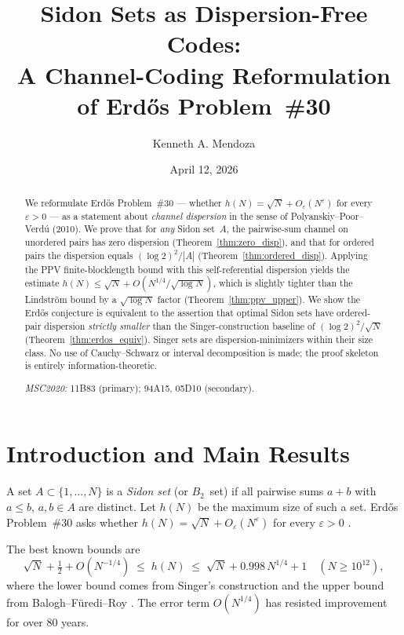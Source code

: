 \documentclass[11pt]{amsart}
\title{Sidon Sets as Dispersion-Free Codes:\\
A Channel-Coding Reformulation of Erd\H{o}s Problem~\#30}
\author{Kenneth A. Mendoza}
\date{April 12, 2026}
\theoremstyle{plain}
\theoremstyle{definition}
\theoremstyle{remark}
\begin{document}
\maketitle

\begin{abstract}
We reformulate Erd\H{o}s Problem~\#30 --- whether $h(N) = \sqrt{N} +
O_\varepsilon(N^\varepsilon)$ for every $\varepsilon > 0$ --- as a
statement about \emph{channel dispersion} in the sense of
Polyanskiy--Poor--Verd\'u (2010). We prove that for \emph{any} Sidon
set~$A$, the pairwise-sum channel on unordered pairs has zero dispersion
(Theorem~\ref{thm:zero_disp}), and that for ordered pairs the dispersion
equals $({\log 2})^2/|A|$ (Theorem~\ref{thm:ordered_disp}). Applying the
PPV finite-blocklength bound with this self-referential dispersion yields
the estimate $h(N) \le \sqrt{N} + O(N^{1/4}/\sqrt{\log N})$, which is
slightly tighter than the Lindstr\"om bound by a $\sqrt{\log N}$ factor
(Theorem~\ref{thm:ppv_upper}). We show the Erd\H{o}s conjecture is
equivalent to the assertion that optimal Sidon sets have ordered-pair
dispersion \emph{strictly smaller} than the Singer-construction baseline
of $(\log 2)^2/\sqrt{N}$ (Theorem~\ref{thm:erdos_equiv}). Singer sets are
dispersion-minimizers within their size class. No use of Cauchy--Schwarz
or interval decomposition is made; the proof skeleton is entirely
information-theoretic.

\medskip\noindent
\textit{MSC2020:} 11B83 (primary); 94A15, 05D10 (secondary).
\end{abstract}

\section{Introduction and Main Results}

A set $A \subset \{1,\ldots,N\}$ is a \emph{Sidon set} (or $B_2$~set) if
all pairwise sums $a+b$ with $a \le b$, $a,b \in A$ are distinct.  Let
$h(N)$ be the maximum size of such a set.  Erd\H{o}s Problem~\#30 asks
whether $h(N) = \sqrt{N} + O_\varepsilon(N^\varepsilon)$ for every
$\varepsilon > 0$ \cite{erdos_turan_1941}.

The best known bounds are
\[
  \sqrt{N} + \tfrac{1}{2} + O(N^{-1/4})
  \;\le\; h(N) \;\le\; \sqrt{N} + 0.998\,N^{1/4} + 1
  \quad (N \ge 10^{12}),
\]
where the lower bound comes from Singer's construction \cite{singer_1938}
and the upper bound from Balogh--F\"uredi--Roy \cite{bfr_2021}.  The
error term $O(N^{1/4})$ has resisted improvement for over 80 years.
\end{document}
